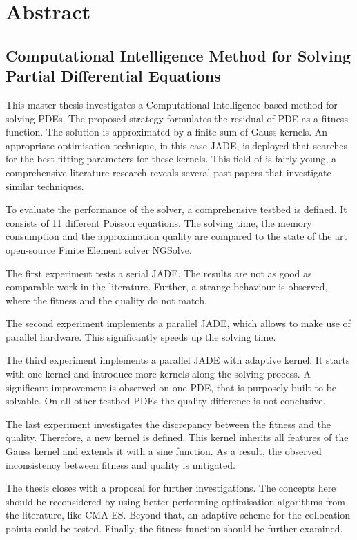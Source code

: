 \documentclass[./\jobname.tex]{subfiles}
\begin{document}
\chapter*{Abstract}
\section*{Computational Intelligence Method for Solving Partial Differential Equations}
%
This master thesis investigates a Computational Intelligence-based method for solving PDEs. The proposed strategy formulates the residual of PDE as a fitness function. The solution is approximated by a finite sum of Gauss kernels. An appropriate optimisation technique, in this case JADE, is deployed that searches for the best fitting parameters for these kernels. This field of is fairly young, a comprehensive literature research reveals several past papers that investigate similar techniques.

To evaluate the performance of the solver, a comprehensive testbed is defined. It consists of 11 different Poisson equations. The solving time, the memory consumption and the approximation quality are compared to the state of the art open-source Finite Element solver NGSolve. 

The first experiment tests a serial JADE. The results are not as good as comparable work in the literature. Further, a strange behaviour is observed, where the fitness and the quality do not match. 

The second experiment implements a parallel JADE, which allows to make use of parallel hardware. This significantly speeds up the solving time.

The third experiment implements a parallel JADE with adaptive kernel. It starts with one kernel and introduce more kernels along the solving process. A significant improvement is observed on one PDE, that is purposely built to be solvable. On all other testbed PDEs the quality-difference is not conclusive. 

The last experiment investigates the discrepancy between the fitness and the quality. Therefore, a new kernel is defined. This kernel inherits all features of the Gauss kernel and extends it with a sine function. As a result, the observed inconsistency between fitness and quality is mitigated. 

The thesis closes with a proposal for further investigations. The concepts here should be reconsidered by using better performing optimisation algorithms from the literature, like CMA-ES. Beyond that, an adaptive scheme for the collocation points could be tested. Finally, the fitness function should be further examined.
%
\end{document}

